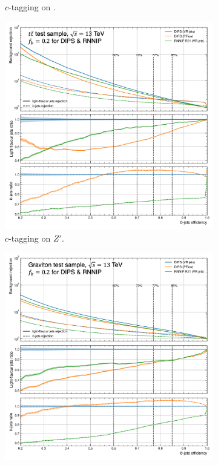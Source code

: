\begin{figure}
\begin{subfigure}[t]{0.32\textwidth}
    \caption{$c$-tagging on \ttb.}
    \label{fig:dipsVRROCttc}
  \end{subfigure}
  \hfill
  \begin{subfigure}[t]{0.32\textwidth}
    \centering
    \includegraphics[width=\textwidth]{Images/FTAG/VRDips/ROC/zpc.png}
    \caption{$c$-tagging on $Z'$.}
    \label{fig:dipsVRROCzpc}
  \end{subfigure}
  \hfill
  \begin{subfigure}[t]{0.32\textwidth}
    \centering
    \includegraphics[width=\textwidth]{Images/FTAG/VRDips/ROC/grc.png}

\end{subfigure}
\end{figure}
